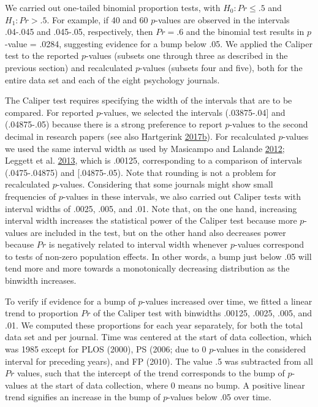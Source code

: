 \documentclass[a5paper]{book}
\begin{document}
We carried out one-tailed binomial proportion tests, with
\(H_{0}: Pr\leq.5\) and \(H_{1}: Pr>.5\). For example, if 40 and 60
\(p\)-values are observed in the intervals .04-.045 and .045-.05,
respectively, then \(Pr=.6\) and the binomial test results in
\(p\)-value = .0284, suggesting evidence for a bump below .05. We
applied the Caliper test to the reported \(p\)-values (subsets one
through three as described in the previous section) and recalculated
\(p\)-values (subsets four and five), both for the entire data set and
each of the eight psychology journals.

The Caliper test requires specifying the width of the intervals that are
to be compared. For reported \(p\)-values, we selected the intervals
(.03875-.04{]} and (.04875-.05) because there is a strong preference to
report \(p\)-values to the second decimal in research papers (see also
Hartgerink
\protect\hyperlink{ref-doi:10.7717ux2fpeerj.3068}{2017}\protect\hyperlink{ref-doi:10.7717ux2fpeerj.3068}{b}).
For recalculated \(p\)-values we used the same interval width as used by
Masicampo and Lalande
\protect\hyperlink{ref-doi:10.1080ux2f17470218.2012.711335}{2012};
Leggett et al.
\protect\hyperlink{ref-doi:10.1080ux2f17470218.2013.863371}{2013}, which
is .00125, corresponding to a comparison of intervals (.0475-.04875) and
{[}.04875-.05). Note that rounding is not a problem for recalculated
\(p\)-values. Considering that some journals might show small
frequencies of \(p\)-values in these intervals, we also carried out
Caliper tests with interval widths of .0025, .005, and .01. Note that,
on the one hand, increasing interval width increases the statistical
power of the Caliper test because more \(p\)-values are included in the
test, but on the other hand also decreases power because \(Pr\) is
negatively related to interval width whenever \(p\)-values correspond to
tests of non-zero population effects. In other words, a bump just below
.05 will tend more and more towards a monotonically decreasing
distribution as the binwidth increases.

To verify if evidence for a bump of \(p\)-values increased over time, we
fitted a linear trend to proportion \(Pr\) of the Caliper test with
binwidths .00125, .0025, .005, and .01. We computed these proportions
for each year separately, for both the total data set and per journal.
Time was centered at the start of data collection, which was 1985 except
for PLOS (2000), PS (2006; due to 0 \(p\)-values in the considered
interval for preceding years), and FP (2010). The value .5 was
subtracted from all \(Pr\) values, such that the intercept of the trend
corresponds to the bump of \(p\)-values at the start of data collection,
where 0 means no bump. A positive linear trend signifies an increase in
the bump of \(p\)-values below .05 over time.
\end{document}
